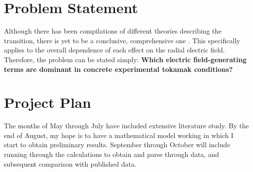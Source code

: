 \documentclass[a4paper]{article}
\begin{document}

\section{Problem Statement}
Although there has been compilations of different theories describing the transition, there is yet to be a conclusive, comprehensive one \cite{connor_review_2000}.
This specifically applies to the overall dependence of each effect on the radial electric field.
Therefore, the problem can be stated simply: \textbf{Which electric field-generating terms are dominant in concrete experimental tokamak conditions?}


\section{Project Plan}
The months of May through July have included extensive literature study.
By the end of August, my hope is to have a mathematical model working in which I start to obtain preliminary results.
September through October will include running through the calculations to obtain and parse through data, and subsequent comparison with published data.


\printbibliography
\end{document}
